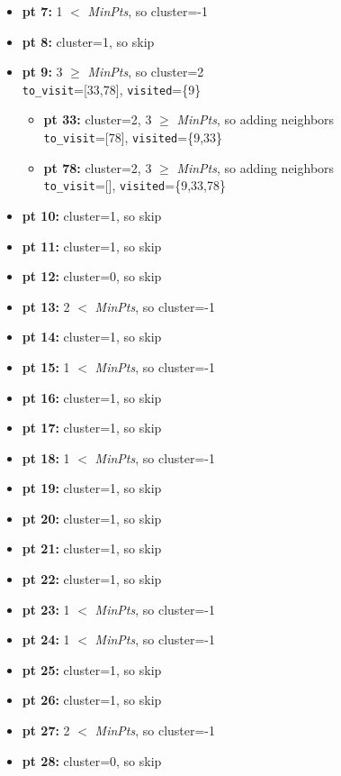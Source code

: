 \documentclass[11pt]{article}
\begin{document}
\begin{itemize}[label=$\star$]
			\item \textbf{pt 7:} 1 $<$ \textit{MinPts}, so cluster=-1
			\item \textbf{pt 8:} cluster=1, so skip
			\item \textbf{pt 9:} 3 $\ge$ \textit{MinPts}, so cluster=2 \\ \texttt{to\_visit}=[33,78], \texttt{visited}=\{9\}
			\begin{itemize}[label=$\cdot$]
				\item \textbf{pt 33:} cluster=2, 3 $\ge$ \textit{MinPts}, so adding neighbors \\ \texttt{to\_visit}=[78], \texttt{visited}=\{9,33\}
				\item \textbf{pt 78:} cluster=2, 3 $\ge$ \textit{MinPts}, so adding neighbors \\ \texttt{to\_visit}=[], \texttt{visited}=\{9,33,78\}
			\end{itemize}
			\item \textbf{pt 10:} cluster=1, so skip
			\item \textbf{pt 11:} cluster=1, so skip
			\item \textbf{pt 12:} cluster=0, so skip
			\item \textbf{pt 13:} 2 $<$ \textit{MinPts}, so cluster=-1
			\item \textbf{pt 14:} cluster=1, so skip
			\item \textbf{pt 15:} 1 $<$ \textit{MinPts}, so cluster=-1
			\item \textbf{pt 16:} cluster=1, so skip
			\item \textbf{pt 17:} cluster=1, so skip
			\item \textbf{pt 18:} 1 $<$ \textit{MinPts}, so cluster=-1
			\item \textbf{pt 19:} cluster=1, so skip
			\item \textbf{pt 20:} cluster=1, so skip
			\item \textbf{pt 21:} cluster=1, so skip
			\item \textbf{pt 22:} cluster=1, so skip
			\item \textbf{pt 23:} 1 $<$ \textit{MinPts}, so cluster=-1
			\item \textbf{pt 24:} 1 $<$ \textit{MinPts}, so cluster=-1
			\item \textbf{pt 25:} cluster=1, so skip
			\item \textbf{pt 26:} cluster=1, so skip
			\item \textbf{pt 27:} 2 $<$ \textit{MinPts}, so cluster=-1
			\item \textbf{pt 28:} cluster=0, so skip

\end{itemize}
\end{document}
